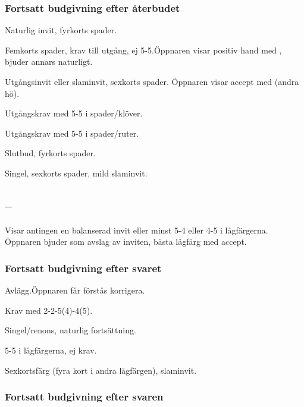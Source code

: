 \subsubsection{Fortsatt budgivning efter {\aa}terbudet }

\bbe
   \item[-\NT{2}] Naturlig invit, fyrkorts spader.
   \item[-\kl{3}] Femkorts spader, krav till utg{\aa}ng, ej 5-5.Öppnaren
                  visar positiv hand med , bjuder annars naturligt.
   \item[-\ru{3}] Utg{\aa}ngsinvit eller slaminvit, sexkorts spader.
                 Öppnaren visar accept med  (andra h\"o).
   \item[-\hj{3}] Utg{\aa}ngskrav med 5-5 i spader/kl\"over.
   \item[-\spa{3}] Utg{\aa}ngskrav med 5-5 i spader/ruter.

   \item[-\NT{3}] Slutbud, fyrkorts spader.
   \item[-\la{4},\hj{4}] Singel, sexkorts spader, mild slaminvit.
 \ebe

\subsection{--}
Visar antingen en balanserad invit eller minst 5-4 eller 4-5 i
l{\aa}gf\"argerna. \"Oppnaren bjuder  som avslag av inviten,
b\"asta l{\aa}gf\"arg med accept.

\subsubsection{Fortsatt budgivning efter svaret }

\bbe
   \item[-\kl{3}] Avl\"agg.Öppnaren f{\aa}r f\"orst{\aa}s korrigera.
   \item[-\ru{3}] Krav med 2-2-5(4)-4(5).
   \item[-\ho{3}] Singel/renons, naturlig forts\"attning.
   \item[-\NT{3}] 5-5 i l{\aa}gf\"argerna, ej krav.
   \item[-\la{4}] Sexkortsf\"arg (fyra kort i andra l{\aa}gf\"argen),
                      slaminvit. 
\ebe

\subsubsection{Fortsatt budgivning efter svaren }

